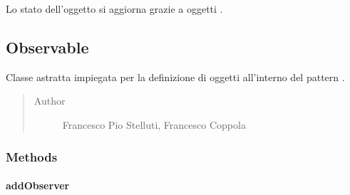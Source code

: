 \documentclass[letterpaper,10pt,italian,openany,oneside]{sphinxmanual}
\begin{document}
\begin{fulllineitems}
\label{\detokenize{source/it/unicam/cs/pa/mastermind/gamecore/MatchState:it.unicam.cs.pa.mastermind.gamecore.MatchState.update(Observable)}}
Lo stato dell’oggetto si aggiorna grazie a oggetti .

\end{fulllineitems}



\subsection{Observable}
\label{\detokenize{source/it/unicam/cs/pa/mastermind/gamecore/Observable:observable}}\label{\detokenize{source/it/unicam/cs/pa/mastermind/gamecore/Observable::doc}}

\begin{fulllineitems}
\label{\detokenize{source/it/unicam/cs/pa/mastermind/gamecore/Observable:it.unicam.cs.pa.mastermind.gamecore.Observable}}
Classe astratta impiegata per la definizione di oggetti  all’interno del pattern .
\begin{quote}\begin{description}
\item[{Author}] \leavevmode
Francesco Pio Stelluti, Francesco Coppola

\end{description}\end{quote}

\end{fulllineitems}



\subsubsection{Methods}
\label{\detokenize{source/it/unicam/cs/pa/mastermind/gamecore/Observable:methods}}

\paragraph{addObserver}
\label{\detokenize{source/it/unicam/cs/pa/mastermind/gamecore/Observable:addobserver}}
\end{document}
